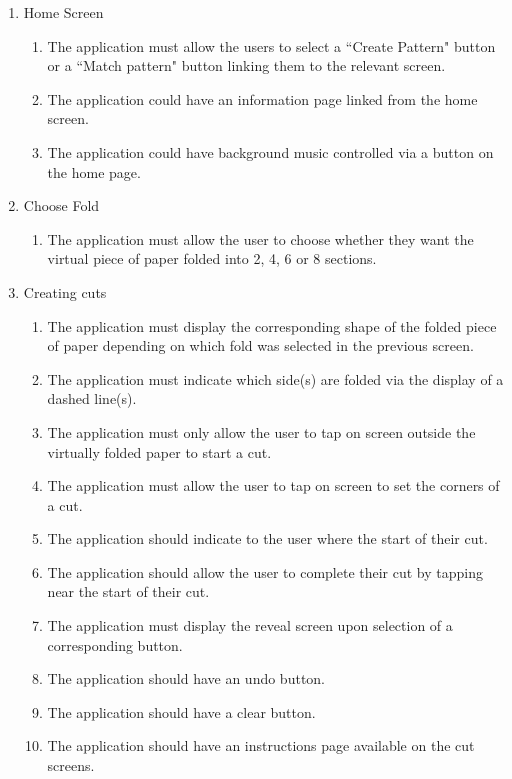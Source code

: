 \documentclass[11pt]{article}
\begin{document}
    \begin{enumerate}
      \item Home Screen
        \begin{enumerate}[label*=\arabic*.]
        \item The application must allow the users to select a ``Create Pattern" button or a ``Match pattern" button linking them to the relevant screen.
        \item The application could have an information page linked from the home screen.
        \item The application could have background music controlled via a button on the home page.
      \end{enumerate}
      
       \item Choose Fold
        \begin{enumerate}[label*=\arabic*.]
        \item The application must allow the user to choose whether they want the virtual piece of paper folded into 2, 4, 6 or 8 sections.
      \end{enumerate}
      
      \item Creating cuts
      \begin{enumerate}[label*=\arabic*.]
        \item The application must display the corresponding shape of the folded piece of paper depending on which fold was selected in the previous screen.
        \item The application must indicate which side(s) are folded via the display of a dashed line(s).
        \item The application must only allow the user to tap on screen outside the virtually folded paper to start a cut. 
        \item The application must allow the user to tap on screen to set the corners of a cut.
        \item The application should indicate to the user where the start of their cut.
        \item The application should allow the user to complete their cut by tapping near the start of their cut. 
        \item The application must display the reveal screen upon selection of a corresponding button.  
         \item The application should have an undo button.
          \item The application should have a clear button.
        \item The application should have an instructions page available on the cut screens. 
      \end{enumerate}
      

\end{enumerate}
\end{document}
